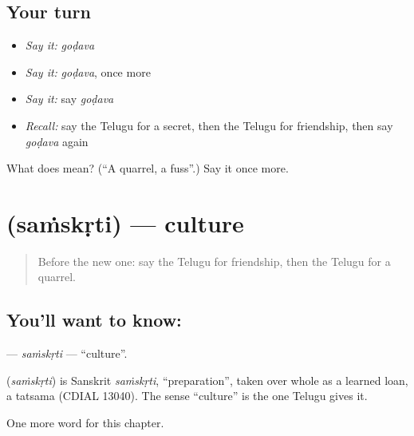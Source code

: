 \subsection*{Your turn}
\begin{itemize}
\raggedright
  \item \emph{Say it:} \emph{goḍava}
  \item \emph{Say it:} \emph{goḍava}, once more
  \item \emph{Say it:} say \emph{goḍava}
  \item \emph{Recall:} say the Telugu for a secret, then the Telugu for friendship, then say \emph{goḍava} again
\end{itemize}

\begin{tcolorbox}[breakable,colback=teal!4,colframe=teal!35!black,title={Before you move on}]
What does  mean? (\textquotedblleft{}A quarrel, a fuss\textquotedblright{}.) Say it once more.
\end{tcolorbox}
\section[\texorpdfstring{\te{సంస్కృతి} (saṁskṛti)}{సంస్కృతి (saṁskṛti)}]{ (saṁskṛti) — culture}

\label{lesson:TE-C257-samskrti}



\begin{quote}
Before the new one: say the Telugu for friendship, then the Telugu for a quarrel.
\end{quote}

\subsection*{You'll want to know: }
\textbf{} — \emph{saṁskṛti} — \textquotedblleft{}culture\textquotedblright{}.

\begin{cousinweb}
\textbf{} (\emph{saṁskṛti}) is Sanskrit \emph{saṁskṛti}, \textquotedblleft{}preparation\textquotedblright{}, taken over whole as a learned loan, a tatsama (CDIAL 13040). The sense \textquotedblleft{}culture\textquotedblright{} is the one Telugu gives it.
\end{cousinweb}

\begin{grammarlens}[title={What you've built}]
One more word for this chapter.
\end{grammarlens}

